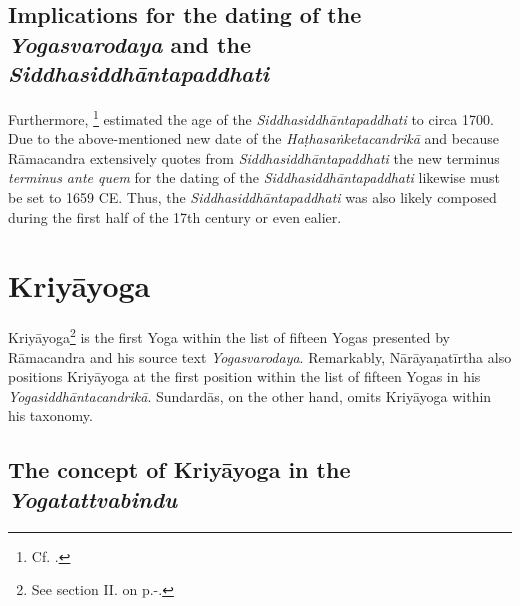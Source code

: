 \subsection{Implications for the dating of the \textit{Yogasvarodaya} and the \textit{Siddhasiddhāntapaddhati}}
Furthermore, \citeauthor{mallinsononline2013}\footnote{Cf. .} estimated the age of the \textit{Siddhasiddhāntapaddhati} to circa 1700. Due to the above-mentioned new date of the \textit{Haṭhasaṅketacandrikā} and because Rāmacandra extensively quotes from \textit{Siddhasiddhāntapaddhati} the new terminus \textit{terminus ante quem} for the dating of the \textit{Siddhasiddhāntapaddhati} likewise must be set to 1659 CE. Thus, the \textit{Siddhasiddhāntapaddhati} was also likely composed during the first half of the 17th century or even ealier.

\section{Kriyāyoga}

Kriyāyoga\footnote{See section II. on p.\pageref{kriyayogastart}-\pageref{kriyayogaend}.} is the first Yoga within the list of fifteen Yogas presented by Rāmacandra and his source text \textit{Yogasvarodaya}. Remarkably, Nārāyaṇatīrtha also positions Kriyāyoga at the first position within the list of fifteen Yogas in his \textit{Yogasiddhāntacandrikā}. Sundardās, on the other hand, omits Kriyāyoga within his taxonomy.

\subsection{The concept of Kriyāyoga in the \textit{Yogatattvabindu}}

